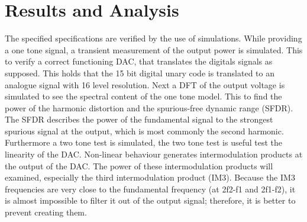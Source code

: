 \section{Results and Analysis}\label{sec:simulations}
The specified specifications are verified by the use of simulations. While providing a one tone signal, a transient measurement of the output power is simulated. This to verify a correct functioning DAC, that translates the digitals signals as supposed. This holds that the 15 bit digital unary code is translated to an analogue signal with 16 level resolution.
Next a DFT of the output voltage is simulated to see the spectral content of the one tone model. This to find the power of the harmonic distortion and the spurious-free dynamic range (SFDR).  The SFDR describes the power of the fundamental signal to the strongest spurious signal at the output, which is most commonly the second harmonic. 
Furthermore a two tone test is simulated, the two tone test is useful test the linearity of the DAC. Non-linear behaviour generates intermodulation products at the output of the DAC. The power of these intermodulation products will examined, especially the third intermodulation product (IM3). Because the IM3 frequencies are very close to the fundamental frequency (at 2f2-f1 and 2f1-f2), it is almost impossible to filter it out of the output signal; therefore, it is better to prevent creating them. 


